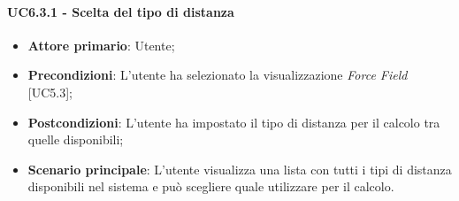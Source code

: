 \paragraph{UC6.3.1 - Scelta del tipo di distanza}
\begin{itemize}
	\item \textbf{Attore primario}: Utente;
	\item \textbf{Precondizioni}: L'utente ha selezionato la visualizzazione \textit{Force Field} [UC5.3];
	\item \textbf{Postcondizioni}: L'utente ha impostato il tipo di distanza per il calcolo tra quelle disponibili;
	
	\item \textbf{Scenario principale}: L'utente visualizza una lista con tutti i tipi di distanza disponibili nel sistema e può scegliere quale utilizzare per il calcolo.
\end{itemize}